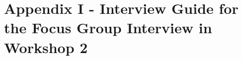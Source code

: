 \section*{Appendix I - Interview Guide for the Focus Group Interview in Workshop 2}
\label{app:interviewGuide2}
\begin{figure}[H] 
\end{figure}

\newpage
